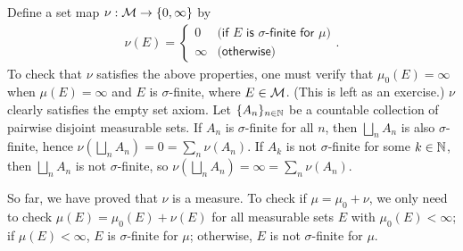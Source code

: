 \begin{sol}
\begin{enumerate}
{            Define a set map $\nu: {\mathcal{M}}\rightarrow\{0, \infty\}$ by
            \begin{align*}
                \nu(E)=\left\{\begin{array}{cc}
                        0   &   \textsf{(if $E$ is $\sigma$-finite for $\mu$)}\\
                    \infty  &   \textsf{(otherwise)}
                \end{array}\right..
            \end{align*}
            To check that $\nu$ satisfies the above properties, one must verify that $\mu_0(E)=\infty$ when $\mu(E)=\infty$ and $E$ is $\sigma$-finite, where $E\in{\mathcal{M}}$.
            \color{brown}(This is left as an exercise.) \color{black}
            $\nu$ clearly satisfies the empty set axiom.
            Let $\{A_n\}_{n\in{\mathbb{N}}}$ be a countable collection of pairwise disjoint measurable sets.
            If $A_n$ is $\sigma$-finite for all $n$, then $\bigsqcup_n A_n$ is also $\sigma$-finite, hence $\nu(\bigsqcup_n A_n)=0=\sum_n\nu(A_n)$.
            If $A_k$ is not $\sigma$-finite for some $k\in{\mathbb{N}}$, then $\bigsqcup_n A_n$ is not $\sigma$-finite, so $\nu(\bigsqcup_n A_n)=\infty=\sum_n\nu(A_n)$.

            So far, we have proved that $\nu$ is a measure.
            To check if $\mu=\mu_0+\nu$, we only need to check $\mu(E)=\mu_0(E)+\nu(E)$ for all measurable sets $E$ with $\mu_0(E)<\infty$; if $\mu(E)<\infty$, $E$ is $\sigma$-finite for $\mu$; otherwise, $E$ is not $\sigma$-finite for $\mu$.
        }
    \end{enumerate}
\end{sol}
